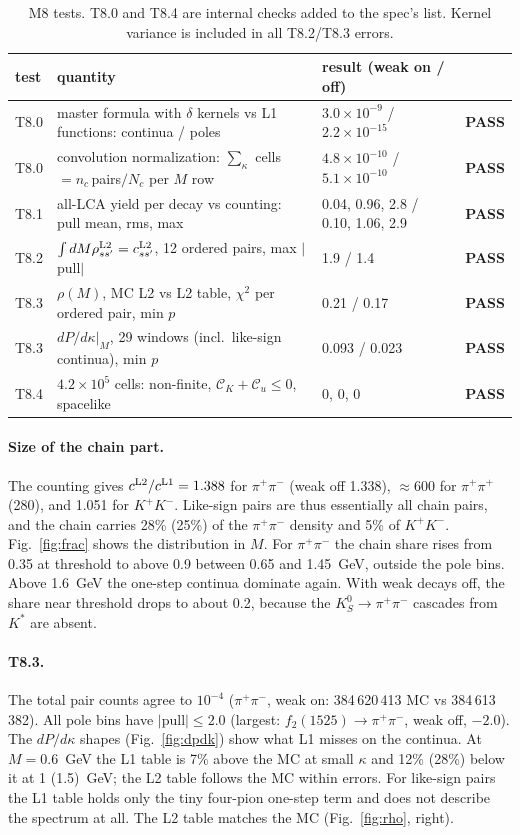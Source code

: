 \documentclass[11pt,a4paper]{article}
\newcommand{\CK}{\mathcal C_K}
\newcommand{\Cu}{\mathcal C_u}
\newcommand{\pass}{\textcolor{green!45!black}{\textbf{PASS}}}
\begin{document}
\begin{table}[H]
\centering\footnotesize
\begin{tabular}{llll}
\toprule
test & quantity & result (weak on / off) & \\
\midrule
T8.0 & master formula with $\delta$ kernels vs L1 functions: continua / poles & $3.0\times10^{-9}$ / $2.2\times10^{-15}$ & \pass\\
T8.0 & convolution normalization: $\sum_\kappa$ cells $= n_c\,$pairs$/N_c$ per $M$ row & $4.8\times10^{-10}$ / $5.1\times10^{-10}$ & \pass\\
T8.1 & all-LCA yield per decay vs counting: pull mean, rms, max & 0.04, 0.96, 2.8 / 0.10, 1.06, 2.9 & \pass\\
T8.2 & $\int dM\rho^{\rm L2}_{ss'}=c^{\rm L2}_{ss'}$, 12 ordered pairs, max $|$pull$|$ & 1.9 / 1.4 & \pass\\
T8.3 & $\rho(M)$, MC L2 vs L2 table, $\chi^2$ per ordered pair, min $p$ & 0.21 / 0.17 & \pass\\
T8.3 & $dP/d\kappa|_M$, 29 windows (incl.\ like-sign continua), min $p$ & 0.093 / 0.023 & \pass\\
T8.4 & $4.2\times10^5$ cells: non-finite, $\CK+\Cu\le0$, spacelike & 0, 0, 0 & \pass\\
\bottomrule
\end{tabular}
\caption{M8 tests. T8.0 and T8.4 are internal checks added to the spec's list. Kernel variance is
included in all T8.2/T8.3 errors.}
\end{table}

\paragraph{Size of the chain part.} The counting gives $c^{\rm L2}/c^{\rm L1}=1.388$ for $\pi^+\pi^-$
(weak off 1.338), $\approx600$ for $\pi^+\pi^+$ (280), and 1.051 for $K^+K^-$. Like-sign pairs are thus
essentially all chain pairs, and the chain carries 28\% (25\%) of the $\pi^+\pi^-$ density and 5\% of
$K^+K^-$. Fig.~\ref{fig:frac} shows the distribution in $M$. For $\pi^+\pi^-$ the chain share rises
from 0.35 at threshold to above 0.9 between 0.65 and 1.45~GeV, outside the pole bins. Above 1.6~GeV
the one-step continua dominate again. With weak decays off, the share near threshold drops to about
0.2, because the $K^0_S\to\pi^+\pi^-$ cascades from $K^*$ are absent.

\paragraph{T8.3.} The total pair counts agree to $10^{-4}$ ($\pi^+\pi^-$, weak on: 384\,620\,413 MC vs
384\,613\,382). All pole bins have $|$pull$|\le2.0$ (largest: $f_2(1525)\to\pi^+\pi^-$, weak off, $-2.0$). The $dP/d\kappa$ shapes (Fig.~\ref{fig:dpdk}) show what L1 misses on the continua. At
$M=0.6$~GeV the L1 table is 7\% above the MC at small $\kappa$ and 12\% (28\%) below it at 1 (1.5)~GeV;
the L2 table follows the MC within errors. For like-sign pairs the L1 table holds only the tiny
four-pion one-step term and does not describe the spectrum at all. The L2 table matches the MC
(Fig.~\ref{fig:rho}, right).
\end{document}
